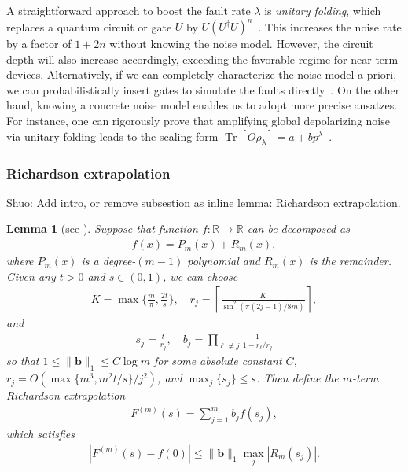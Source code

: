 \documentclass[aps,pra,reprint,groupedaddress,floatfix]{revtex4-2}
\newtheorem{lemma}{Lemma}
\newcommand{\mb}{\mathbb}
\newcommand{\sz}[1]{{\color{blue} Shuo: #1}}
\begin{document}
A straightforward approach to boost the fault rate $\lambda$ is \textit{unitary folding}, which replaces a quantum circuit or gate $U$ by $U(U^\dagger U)^n$~\cite{giurgica-tiron_digital_2020, DumitrescuEtAl2018, HeEtAl2020}. This increases the noise rate by a factor of $1+2n$ without knowing the noise model. However, the circuit depth will also increase accordingly, exceeding the favorable regime for near-term devices. Alternatively, if we can completely characterize the noise model a priori, we can probabilistically insert gates to simulate the faults directly~\cite {li2017efficient}. On the other hand, knowing a concrete noise model enables us to adopt more precise ansatzes. For instance, one can rigorously prove that amplifying global depolarizing noise via unitary folding leads to the scaling form $\operatorname{Tr}[O\rho_\lambda]=a+bp^\lambda$~\cite{giurgica-tiron_digital_2020}.


\subsubsection{Richardson extrapolation}\label{sec:Richardson}
\sz{Add intro, or remove subsestion as inline lemma: Richardson extrapolation.}
\begin{lemma}[{see \cite[Lemma A.9]{wang2025randomized}}]
\label{lem:richardson-extrapolation}
    Suppose that function $f\colon \mb R \to \mathbb{R}$ can be decomposed as 
    \begin{align*}
        f(x) = P_m(x)+R_m(x),
    \end{align*} 
    where $P_m(x)$ is a degree-$(m-1)$ polynomial and $R_m(x)$ is the remainder. Given any $t > 0$ and $s\in (0,1)$, we can choose 
    \begin{align*}
        K = \max\Big\{\frac{m}{\pi}, \frac{2t}{s}\Big\}, \quad r_j =\left\lceil \frac{K}{\sin^2(\pi(2j-1)/8m)}\right\rceil,
    \end{align*}
    and
    \begin{align*}
        s_j = \frac{t}{r_j}, \quad b_j=\prod_{\ell \neq j} \frac{1}{1-r_\ell/r_j}
    \end{align*}
    so that $1\le \|\mathbf{b}\|_1 \le C\log m$ for some absolute constant $C$, $r_j=O(\max\{m^3, m^2t/s\}/j^2)$, and $\max_{j}\{ s_j \}\le s$. Then define the $m$-term Richardson extrapolation \begin{align}
        \label{eq_richardson extrapolation}
        F^{(m)}(s)=\sum_{j=1}^m b_j f(s_j),
    \end{align}
    which satisfies \begin{align}
    \label{eq:error-F}
        |F^{(m)}(s)-f(0)|\le \|\mathbf{b}\|_1 \max_j|R_{m}(s_j)|.
    \end{align}
\end{lemma}
\end{document}
